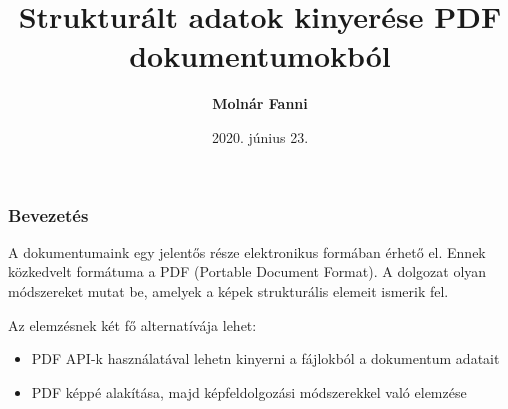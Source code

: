 \documentclass{beamer}
\begin{document}

\title[Strukturált adatok kinyerése PDF dokumentumokból]{Strukturált adatok kinyerése PDF dokumentumokból}
\author[Molnár Fanni]{\textbf{Molnár Fanni}}
\date{2020. június 23.}

\frame{\titlepage}

\begin{frame}[fragile]
\frametitle{Bevezetés}

A dokumentumaink egy jelentős része elektronikus formában érhető el. Ennek közkedvelt formátuma a PDF (Portable Document Format). 
A dolgozat olyan módszereket mutat be, amelyek a képek strukturális elemeit ismerik fel.

\smallskip

Az elemzésnek két fő alternatívája lehet:

\bigskip

\begin{itemize}
    \item PDF API-k használatával lehetn kinyerni a fájlokból a dokumentum adatait
    \item PDF képpé alakítása, majd képfeldolgozási módszerekkel való elemzése
\end{itemize}

\end{frame}
\end{document}

